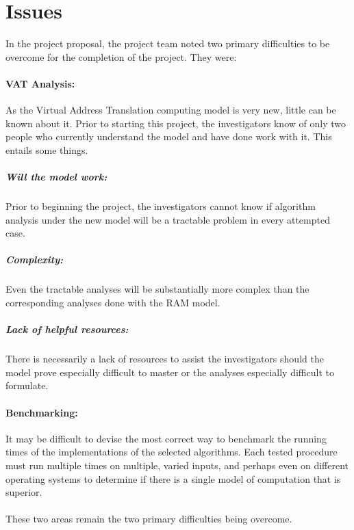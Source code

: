 \section{Issues}
  In the project proposal, the project team noted two primary
  difficulties to be overcome for the completion of the project. They were:
  
  \paragraph{VAT Analysis:} As the Virtual Address Translation computing model
  is very new, little can be known about it. Prior to starting this project,
  the investigators know of only two people who currently understand the model
  and have done work with it. This entails some things.
    \subparagraph{Will the model work:} Prior to beginning the project, the
    investigators cannot know if algorithm analysis under the new model will be
    a tractable problem in every attempted case.
    \subparagraph{Complexity:} Even the tractable analyses will be
    substantially more complex than the corresponding analyses done with the
    RAM model.
    \subparagraph{Lack of helpful resources:} There is necessarily a lack of
    resources to assist the investigators should the model prove especially
    difficult to master or the analyses especially difficult to formulate.
    
  \paragraph{Benchmarking:} It may be difficult to devise the most correct way
  to benchmark the running times of the implementations of the selected
  algorithms. Each tested procedure must run multiple times on multiple, varied
  inputs, and perhaps even on different operating systems to determine if
  there is a single model of computation that is superior.
  
  \paragraph{} These two areas remain the two primary difficulties being
  overcome.